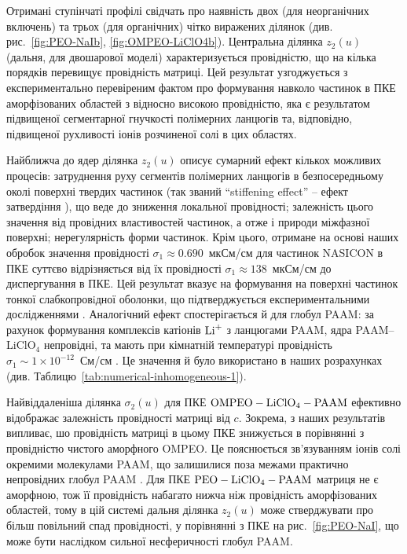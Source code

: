 \documentclass[14pt,twoside]{vakthesis}
\begin{document}
Отримані ступінчаті профілі свідчать про наявність двох (для неорганічних включень) та трьох (для органічних) чітко виражених ділянок (див. рис.~\ref{fig:PEO-NaIb}, \ref{fig:OMPEO-LiClO4b}). 
Центральна ділянка ${z}_2(u)$ (дальня, для двошарової моделі) характеризується провідністю, що на кілька порядків перевищує провідність матриці. Цей результат узгоджується з експериментально перевіреним фактом \cite{nanocomp2008} про формування навколо частинок в ПКЕ аморфізованих областей з відносно високою провідністю, яка є результатом підвищеної сегментарної гнучкості полімерних ланцюгів та, відповідно, підвищеної рухливості іонів розчиненої солі в цих областях. 

Найближча до ядер  ділянка ${z}_2(u)$ описує сумарний ефект кількох можливих процесів: затруднення руху сегментів полімерних ланцюгів  в безпосередньому околі поверхні твердих частинок (так званий ``stiffening effect'' -- ефект затвердіння \cite{Wiec1994, nanocomp2008}), що веде до зниження локальної провідності; залежність цього значення від провідних властивостей частинок, а отже і природи міжфазної поверхні; нерегулярність форми частинок. Крім цього, отримане на основі наших обробок значення провідності $\sigma_1\approx 0.690$~мкСм/см для частинок NASICON в ПКЕ суттєво відрізняється від їх провідності $\sigma_1\approx 138$~мкСм/см до диспергування в ПКЕ. Цей результат вказує на формування на поверхні частинок тонкої слабкопровiдної оболонки, що підтверджується експериментальними дослідженнями \cite{Ploch1988}. Аналогічний ефект спостерігається й для глобул PAAM: за рахунок формування комплексів катіонів $\rm{Li}^+ $ з ланцюгами PAAM, ядра PAAM--LiClO$_4$ непровідні, та мають при кімнатній температурі провідність $\sigma_1\sim 1\times 10^{-12}$~См/см \cite{Wiec1994}. Це значення й було використано в наших розрахунках (див. Таблицю~\ref{tab:numerical-inhomogeneous-1}).

Найвіддаленіша ділянка $\sigma_2(u)$ для ПКЕ $\rm OMPEO-LiClO_4-PAAM$ ефективно відображає залежність провідності матриці від $c$. Зокрема, з наших результатів випливає, шо провідність  матриці в цьому ПКЕ знижується в порівнянні з провідністю чистого аморфного OMPEO. Це пояснюється зв'язуван\-ням іонів солі окремими молекулами PAAM, що залишилися поза межами практично  непровідних глобул PAAM \cite{Wiec1994}. Для ПКЕ $\rm PEO-LiClO_4-PAAM$ матриця не є аморфною, тож її провідність набагато нижча ніж провідність аморфізованих областей, тому в цій системі дальня ділянка ${z}_2(u)$ може стверджувати про більш повільний спад провідності, у порівнянні з ПКЕ на рис.~\ref{fig:PEO-NaI}, що може бути наслідком сильної несферичності глобул PAAM.
\end{document}
